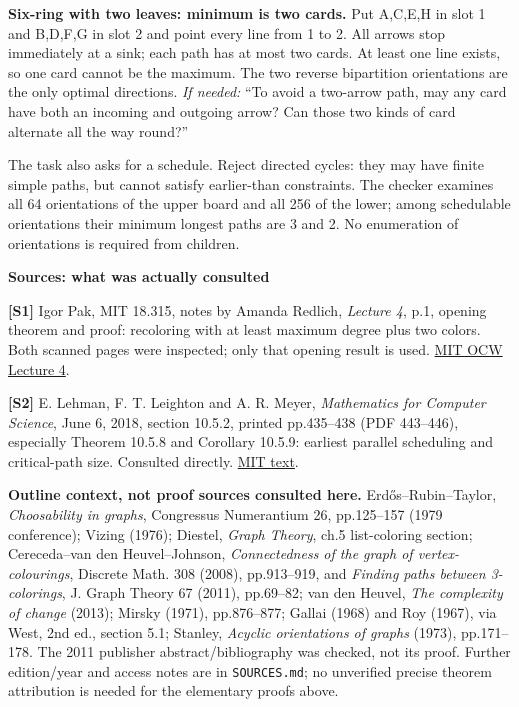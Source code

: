 \documentclass[10pt]{article}
\newcommand{\sub}[1]{\par\textbf{#1}\par}
\newcommand{\hint}[1]{\textit{If needed:} #1}
\newcommand{\word}[1]{\texttt{#1}}
\begin{document}
\textbf{Six-ring with two leaves: minimum is two cards.} Put A,C,E,H in slot 1 and B,D,F,G in slot 2 and point every line from 1 to 2. All arrows stop immediately at a sink; each path has at most two cards. At least one line exists, so one card cannot be the maximum. The two reverse bipartition orientations are the only optimal directions. \hint{``To avoid a two-arrow path, may any card have both an incoming and outgoing arrow? Can those two kinds of card alternate all the way round?''}

The task also asks for a schedule. Reject directed cycles: they may have finite simple paths, but cannot satisfy earlier-than constraints. The checker examines all 64 orientations of the upper board and all 256 of the lower; among schedulable orientations their minimum longest paths are 3 and 2. No enumeration of orientations is required from children.

\sub{Sources: what was actually consulted}
\textbf{[S1]} Igor Pak, MIT 18.315, notes by Amanda Redlich, \emph{Lecture 4}, p.1, opening theorem and proof: recoloring with at least maximum degree plus two colors. Both scanned pages were inspected; only that opening result is used. \href{https://ocw.mit.edu/courses/18-315-combinatorial-theory-introduction-to-graph-theory-extremal-and-enumerative-combinatorics-spring-2005/1a85b3cef5c53f1dbab7dd5d18b54035_lec04.pdf}{MIT OCW Lecture 4}.

\textbf{[S2]} E. Lehman, F. T. Leighton and A. R. Meyer, \emph{Mathematics for Computer Science}, June 6, 2018, section 10.5.2, printed pp.435--438 (PDF 443--446), especially Theorem 10.5.8 and Corollary 10.5.9: earliest parallel scheduling and critical-path size. Consulted directly. \href{https://courses.csail.mit.edu/6.042/spring18/mcs.pdf}{MIT text}.

\textbf{Outline context, not proof sources consulted here.} Erd\H{o}s--Rubin--Taylor, \emph{Choosability in graphs}, Congressus Numerantium 26, pp.125--157 (1979 conference); Vizing (1976); Diestel, \emph{Graph Theory}, ch.5 list-coloring section; Cereceda--van den Heuvel--Johnson, \emph{Connectedness of the graph of vertex-colourings}, Discrete Math. 308 (2008), pp.913--919, and \emph{Finding paths between 3-colorings}, J. Graph Theory 67 (2011), pp.69--82; van den Heuvel, \emph{The complexity of change} (2013); Mirsky (1971), pp.876--877; Gallai (1968) and Roy (1967), via West, 2nd ed., section 5.1; Stanley, \emph{Acyclic orientations of graphs} (1973), pp.171--178. The 2011 publisher abstract/bibliography was checked, not its proof. Further edition/year and access notes are in \word{SOURCES.md}; no unverified precise theorem attribution is needed for the elementary proofs above.
\end{document}

